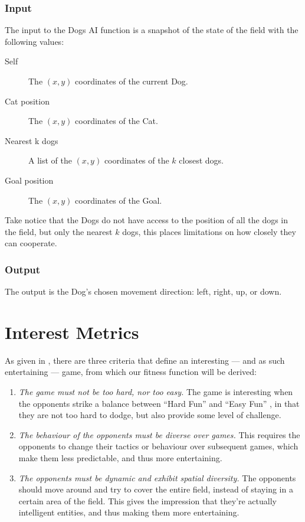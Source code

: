 \subsubsection{Input}
\label{sec:input}

The input to the Dogs AI function is a snapshot of the state of the field with
the following values:

\begin{description}
\item[Self] The \((x,y)\) coordinates of the current Dog.
\item[Cat position] The \((x,y)\) coordinates of the Cat.
\item[Nearest k dogs] A list of the \((x,y)\) coordinates of the \(k\) closest
  dogs.
\item[Goal position] The \((x,y)\) coordinates of the Goal.
\end{description}

Take notice that the Dogs do not have access to the position of all the dogs in
the field, but only the nearest \(k\) dogs, this places limitations on how
closely they can cooperate.

\subsubsection{Output}
\label{sec:output}

The output is the Dog's chosen movement direction: left, right, up, or down.

\section{Interest Metrics}
\label{sec:interest-metrics}

As given in \citet{yannakakis2005ai}, there are three criteria that define an
interesting --- and as such entertaining --- game, from which our fitness
function will be derived:

\begin{enumerate}
\item \emph{The game must not be too hard, nor too easy.} The game is
  interesting when the opponents strike a balance between ``Hard Fun'' and
  ``Easy Fun'' \citep{lazzaro2004we}, in that they are not too hard to dodge,
  but also provide some level of challenge.
\item \emph{The behaviour of the opponents must be diverse over games.} This
  requires the opponents to change their tactics or behaviour over subsequent
  games, which make them less predictable, and thus more entertaining.
\item \emph{The opponents must be dynamic and exhibit spatial diversity.} The
  opponents should move around and try to cover the entire field, instead of
  staying in a certain area of the field. This gives the impression that they're
  actually intelligent entities, and thus making them more entertaining.
\end{enumerate}


